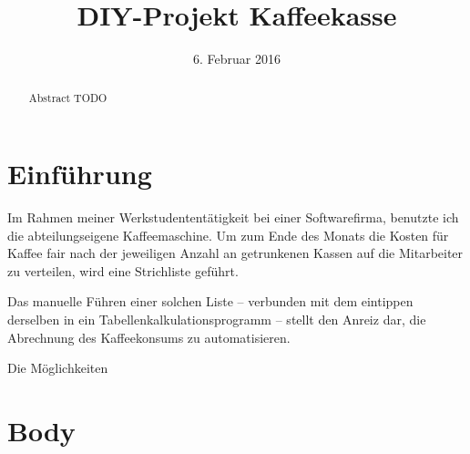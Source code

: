 \documentclass[11pt,a4paper]{IEEEtran}
\begin{document}
\title{DIY-Projekt Kaffeekasse}
\author{
}

\date{6. Februar 2016}

\maketitle
\begin{abstract}
    Abstract TODO
\end{abstract}

\section{Einführung}

Im Rahmen meiner Werkstudententätigkeit bei einer Softwarefirma, benutzte ich 
die abteilungseigene Kaffeemaschine. Um zum Ende des Monats die Kosten für
Kaffee fair nach der jeweiligen Anzahl an getrunkenen Kassen auf die Mitarbeiter
zu verteilen, wird eine Strichliste geführt.

Das manuelle Führen einer solchen Liste -- verbunden mit dem eintippen
derselben in ein Tabellenkalkulationsprogramm -- stellt den Anreiz dar, die 
Abrechnung des Kaffeekonsums zu automatisieren.

Die Möglichkeiten 

\section{Body} %
%

%
%
\end{document}
